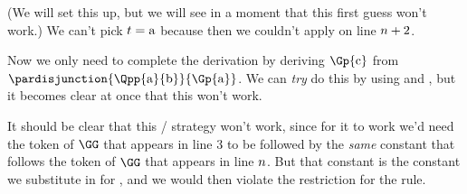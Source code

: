 (We will set this up, but we will see in a moment that this first guess won't work.)
We can't pick $t=\mathrm{a}$ because then we couldn't apply  on line $n+2$.
\begin{gproof}[\label{GQDExampleJ}]
\end{gproof}
Now we only need to complete the derivation by deriving $\Gp{\constant{c}}$ from $\pardisjunction{\Qpp{\constant{a}}{\constant{b}}}{\Gp{\constant{a}}}$. 
We can \emph{try} do this by using  and , but it becomes clear at once that this won't work.
\begin{gproof}[\label{GQDExampleK}]
\end{gproof}
It should be clear that this / strategy won't work, since for it to work we'd need the token of $\GG$ that appears in line 3 to be followed by the \emph{same} constant that follows the token of $\GG$ that appears in line $n$. 
But that constant is the constant we substitute in for , and we would then violate the restriction for the rule. 

